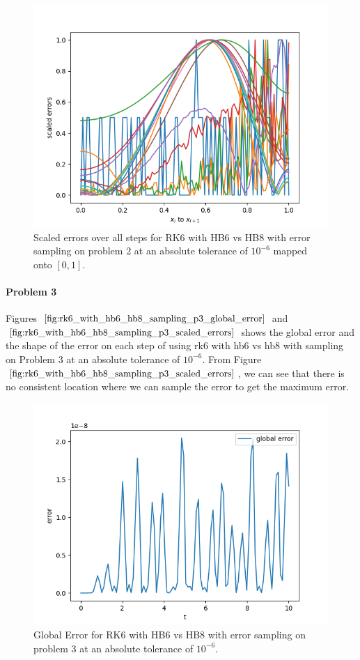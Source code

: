 \begin{figure}[H]
\centering
\includegraphics[width=0.7\linewidth]{./figures/rk6_with_hb6_hb8_sampling_p2_scaled_errors}
\caption{Scaled errors over all steps for RK6 with HB6 vs HB8 with error sampling on problem 2 at an absolute tolerance of $10^{-6}$ mapped onto $[0, 1]$.}
\label{fig:rk6_with_hb6_hb8_sampling_p2_scaled_errors}
\end{figure}

\paragraph{Problem 3} Figures $\ref{fig:rk6_with_hb6_hb8_sampling_p3_global_error}$ and $\ref{fig:rk6_with_hb6_hb8_sampling_p3_scaled_errors}$ shows the global error and the shape of the error on each step of using rk6 with hb6 vs hb8 with sampling on Problem 3 at an absolute tolerance of $10^{-6}$. From Figure $\ref{fig:rk6_with_hb6_hb8_sampling_p3_scaled_errors}$, we can see that there is no consistent location where we can sample the error to get the maximum error.

\begin{figure}[H]
\centering
\includegraphics[width=0.7\linewidth]{./figures/rk6_with_hb6_hb8_sampling_p3_global_error}
\caption{Global Error for RK6 with HB6 vs HB8 with error sampling on problem 3 at an absolute tolerance of $10^{-6}$.}
\label{fig:rk6_with_hb6_hb8_sampling_p3_global_error}
\end{figure}

